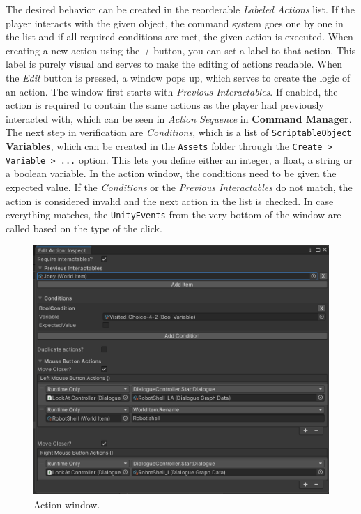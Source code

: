 The desired behavior can be created in the reorderable \textit{Labeled Actions} list. If the player interacts with the given object, the command system goes one by one in the list and if all required conditions are met, the given action is executed. When creating a new action using the \textit{+} button, you can set a label to that action. This label is purely visual and serves to make the editing of actions readable. When the \textit{Edit} button is pressed, a window pops up, which serves to create the logic of an action. The window first starts with \textit{Previous Interactables}. If enabled, the action is required to contain the same actions as the player had previously interacted with, which can be seen in \textit{Action Sequence} in \textbf{Command Manager}. The next step in verification are \textit{Conditions}, which is a list of \verb|ScriptableObject| \textbf{Variables}, which can be created in the \verb|Assets| folder through the \verb|Create > Variable > ...| option. This lets you define either an integer, a float, a string or a boolean variable. In the action window, the conditions need to be given the expected value. If the \textit{Conditions} or the \textit{Previous Interactables} do not match, the action is considered invalid and the next action in the list is checked. In case everything matches, the \verb|UnityEvents| from the very bottom of the window are called based on the type of the click.

\begin{figure}[H]
\centering
\includegraphics[width=.8\linewidth]{img/User doc/action_window.png}
\caption{Action window.}
\label{fig:BaSS-manual}
\end{figure}

